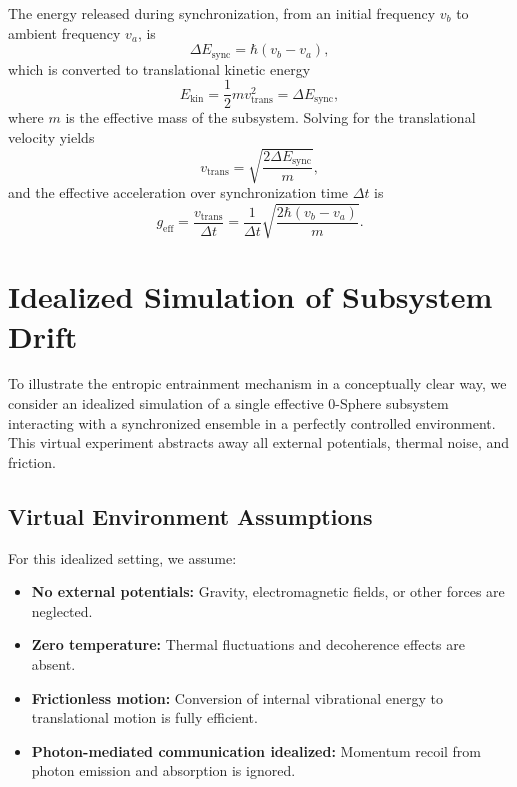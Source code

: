 \documentclass[
 reprint,
 amsmath,amssymb,
 aps,
 prb,
]{revtex4-2}
\numberwithin{equation}{section}
\begin{document}
The energy released during synchronization, from an initial frequency $v_b$ to ambient frequency $v_a$, is
\begin{equation}
\Delta E_\text{sync} = \hbar (v_b - v_a),
\label{eq:sync_energy_repeat}
\end{equation}
which is converted to translational kinetic energy
\begin{equation}
E_\text{kin} = \frac{1}{2} m v_\text{trans}^2 = \Delta E_\text{sync},
\label{eq:kinetic_energy}
\end{equation}
where $m$ is the effective mass of the subsystem. Solving for the translational velocity yields
\begin{equation}
v_\text{trans} = \sqrt{\frac{2 \Delta E_\text{sync}}{m}},
\label{eq:trans_velocity}
\end{equation}
and the effective acceleration over synchronization time $\Delta t$ is
\begin{equation}
g_\text{eff} = \frac{v_\text{trans}}{\Delta t} = \frac{1}{\Delta t} \sqrt{\frac{2 \hbar (v_b - v_a)}{m}}.
\label{eq:acceleration_formula}
\end{equation}

\section{Idealized Simulation of Subsystem Drift}
\label{sec:idealized_simulation}

To illustrate the entropic entrainment mechanism in a conceptually clear way, we consider an idealized simulation of a single effective 0-Sphere subsystem interacting with a synchronized ensemble in a perfectly controlled environment. This virtual experiment abstracts away all external potentials, thermal noise, and friction.

\subsection{Virtual Environment Assumptions}

For this idealized setting, we assume:
\begin{itemize}
\item \textbf{No external potentials:} Gravity, electromagnetic fields, or other forces are neglected.
\item \textbf{Zero temperature:} Thermal fluctuations and decoherence effects are absent.
\item \textbf{Frictionless motion:} Conversion of internal vibrational energy to translational motion is fully efficient.
\item \textbf{Photon-mediated communication idealized:} Momentum recoil from photon emission and absorption is ignored.
\end{itemize}
\end{document}
